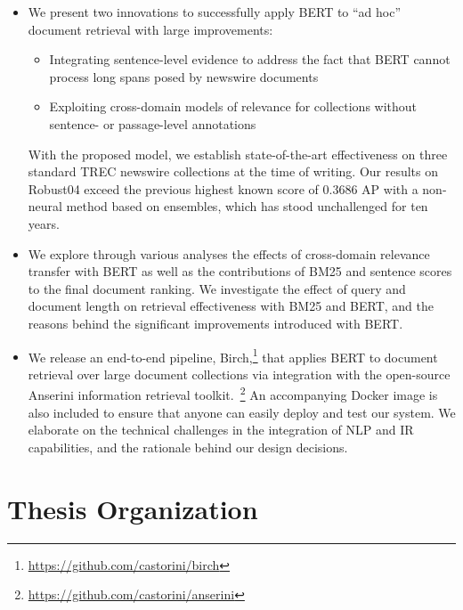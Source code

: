 \begin{itemize}
	\item
	We present two innovations to successfully apply BERT to ``ad hoc'' document retrieval 	with large improvements:\
	\begin{itemize}
		\item Integrating sentence-level evidence to address the fact that BERT cannot process long spans posed by newswire documents
		\item Exploiting cross-domain models of relevance for collections without sentence- or passage-level annotations
	\end{itemize}
	With the proposed model, we establish state-of-the-art effectiveness on three standard TREC newswire collections at the time of writing.
	Our results on Robust04 exceed the previous highest known score of 0.3686 AP \cite{Cormack:2009:RRF:1571941.1572114} with a non-neural method based on ensembles, which has stood unchallenged for ten years.

	\item
	We explore through various analyses the effects of cross-domain relevance transfer with BERT as well as the contributions of BM25 and sentence scores to the final document ranking.
	We investigate the effect of query and document length on retrieval effectiveness with BM25 and BERT, and the reasons behind the significant improvements introduced with BERT.

	\item
	We release an end-to-end pipeline, Birch,\footnote{\url{https://github.com/castorini/birch}} that applies BERT to document retrieval over large document collections via integration with the open-source Anserini information retrieval toolkit.~\footnote{\url{https://github.com/castorini/anserini}}
	An accompanying Docker image is also included to ensure that anyone can easily deploy and test our system.
	We elaborate on the technical challenges in the integration of NLP and IR capabilities, and the rationale behind our design decisions.
\end{itemize}

\newpage

\section{Thesis Organization}

